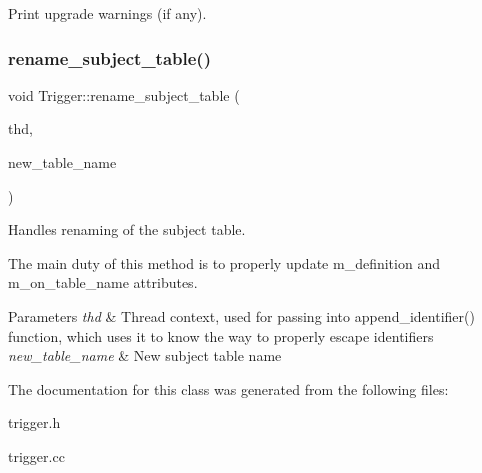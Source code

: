 Print upgrade warnings (if any). \mbox{\label{classTrigger_a021e00d7cb4a31340c06526642b2b035}} 
\subsubsection{\texorpdfstring{rename\+\_\+subject\+\_\+table()}{rename\_subject\_table()}}
{\footnotesize\ttfamily void Trigger\+::rename\+\_\+subject\+\_\+table (\begin{DoxyParamCaption}\item[{T\+HD $\ast$}]{thd,  }\item[{const L\+E\+X\+\_\+\+S\+T\+R\+I\+NG \&}]{new\+\_\+table\+\_\+name }\end{DoxyParamCaption})}

Handles renaming of the subject table.

The main duty of this method is to properly update m\+\_\+definition and m\+\_\+on\+\_\+table\+\_\+name attributes.


\begin{DoxyParams}{Parameters}
{\em thd} & Thread context, used for passing into append\+\_\+identifier() function, which uses it to know the way to properly escape identifiers \\
\hline
{\em new\+\_\+table\+\_\+name} & New subject table name \\
\hline
\end{DoxyParams}


The documentation for this class was generated from the following files\+:\begin{DoxyCompactItemize}
\item 
trigger.\+h\item 
trigger.\+cc\end{DoxyCompactItemize}

